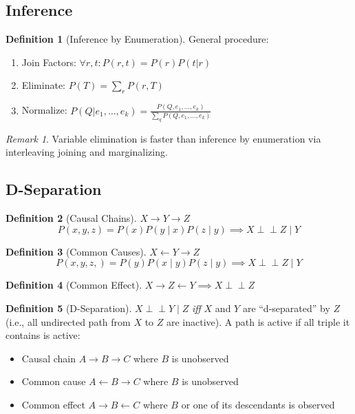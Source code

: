 \documentclass[11pt]{article}
\theoremstyle{definition}
\newtheorem{definition}{Definition}[section]
\theoremstyle{remark}
\newtheorem*{remark}{Remark}
\newcommand{\indep}{\perp \!\!\! \perp}
\begin{document}
\subsection{Inference}
\begin{definition}[Inference by Enumeration]
General procedure:
\begin{enumerate}
\item Join Factors: $\forall r,t: P(r,t)=P(r)P(t|r)$
\item Eliminate: $P(T)=\sum_r P(r,T)$
\item Normalize: $P(Q|e_1,\dots,e_k)=\frac{P(Q,e_1,\dots,e_k)}{\sum_q P(Q,e_1,\dots,e_k)}$
\end{enumerate}
\end{definition}

\begin{remark}
Variable elimination is faster than inference by enumeration via interleaving joining and marginalizing.
\end{remark}

\subsection{D-Separation}
\begin{definition}[Causal Chains] $X \to Y \to Z$ 
$$P(x,y,z) = P(x)P(y \mid x)P(z \mid y)\implies X\indep Z \mid Y$$
\end{definition}

\begin{definition}[Common Causes] $X \leftarrow Y \to Z$
\[   P(x,y,z,) = P(y)P(x \mid y) P(z \mid y) \implies X\indep Z \mid Y       \]
\end{definition}

\begin{definition}[Common Effect] $X\to Z \leftarrow Y \implies X \indep Z$
\end{definition}
\begin{definition}[D-Separation]
$X \indep Y \mid Z$ \textit{iff} $X$ and $Y$ are ``d-separated'' by $Z$ (i.e., all undirected path from $X$ to $Z$ are inactive). A path is active if all triple it contains is active:
\begin{itemize}
\item Causal chain $A\to B\to C$ where $B$ is unobserved
\item Common cause $A\leftarrow B \to C$ where $B$ is unobserved
\item Common effect $A \to B \leftarrow C$ where $B$ or one of its descendants is observed
\end{itemize}
\end{definition}
\end{document}
